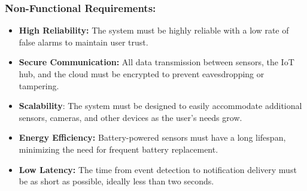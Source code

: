 \documentclass[conference]{IEEEtran}
\begin{document}
\subsubsection{\textbf{Non-Functional Requirements:} \cite{wang_iot_devices_security_2024}}
\begin{itemize}
    \item \textbf{High Reliability:} The system must be highly reliable with a low rate of false alarms to maintain user trust.
    \item \textbf{Secure Communication:} All data transmission between sensors, the IoT hub, and the cloud must be encrypted to prevent eavesdropping or tampering.
    \item \textbf{Scalability}: The system must be designed to easily accommodate additional sensors, cameras, and other devices as the user’s needs grow.
    \item \textbf{Energy Efficiency:} Battery-powered sensors must have a long lifespan, minimizing the need for frequent battery replacement.
    \item \textbf{Low Latency:} The time from event detection to notification delivery must be as short as possible, ideally less than two seconds.
\end{itemize}


\end{document}
